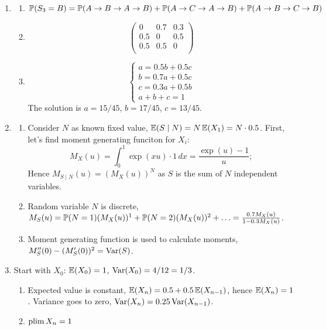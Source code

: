\begin{enumerate}
    \item   
    \begin{enumerate}
      \item $\P(S_3 = B) = \P(A\to B\to A\to B) + \P(A\to C\to A\to B) + \P(A\to B\to C\to B)$
      \item 
      \[
      \begin{pmatrix}
        0 & 0.7 & 0.3 \\
        0.5 & 0 & 0.5 \\
        0.5 & 0.5 & 0 \\
      \end{pmatrix}  
      \]
      \item 
      \[
      \begin{cases}
        a = 0.5 b + 0.5 c \\
        b = 0.7 a + 0.5 c \\
        c = 0.3 a + 0.5 b \\
        a + b + c = 1  
      \end{cases}
      \]
      The solution is $a= 15/45$, $b=17/45$, $c=13/45$.
    \end{enumerate}
    


    \item
  
    \begin{enumerate}
      \item Consider $N$ as known fixed value, $\E(S \mid N) = N\E(X_1) = N\cdot 0.5$.
      First, let's find moment generating funciton for $X_i$:
      \[
      M_X(u) = \int_0^1 \exp(xu) \cdot 1 \, dx = \frac{\exp(u) - 1}{u}; 
      \]
      Hence $M_{S\mid N}(u) = (M_X(u))^N$ as $S$ is the sum of $N$ independent variables.
      \item Random variable $N$ is discrete, $M_S(u) = \P(N=1)(M_X(u))^1 + \P(N=2)(M_X(u))^2 + \ldots = \frac{0.7 M_X(u)}{ 1 -0.3M_X(u)}$.
      \item Moment generating function is used to calculate moments, $M_S''(0) - (M_S'(0))^2 = \Var(S)$.
    \end{enumerate}
  

    
    \item 
    Start with $X_0$: $\E(X_0) = 1$, $\Var(X_0) = 4/12 = 1/3$.

    \begin{enumerate}
      \item Expected value is constant, $\E(X_n) = 0.5 + 0.5 \E(X_{n-1})$, hence $\E(X_n) = 1$. 
      Variance goes to zero, $\Var(X_n) = 0.25 \Var(X_{n-1})$.
      \item $\plim X_n = 1$
    \end{enumerate}
    

\end{enumerate}
